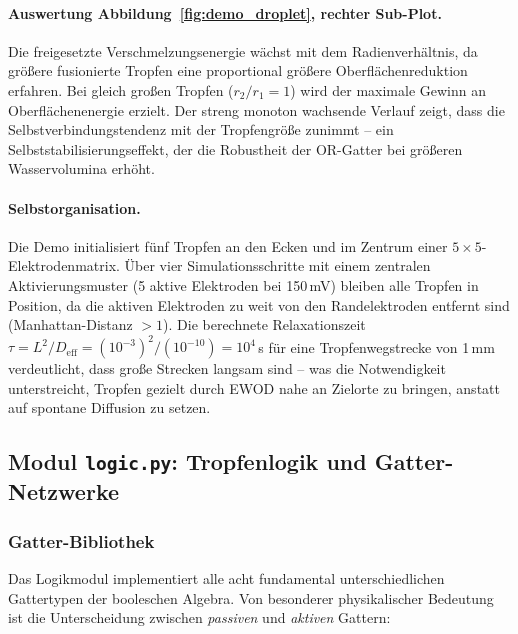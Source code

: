 ﻿\documentclass[a4paper,12pt]{scrreprt}
\theoremstyle{definition}
\begin{document}
\paragraph{Auswertung Abbildung~\ref{fig:demo_droplet}, rechter Sub-Plot.}
Die freigesetzte Verschmelzungsenergie wächst mit dem Radienverhältnis,
da größere fusionierte Tropfen eine proportional größere Oberflächenreduktion
erfahren. Bei gleich großen Tropfen ($r_2/r_1 = 1$) wird der maximale Gewinn
an Oberflächenenergie erzielt. Der streng monoton wachsende Verlauf zeigt,
dass die Selbstverbindungstendenz mit der Tropfengröße zunimmt -- ein
Selbststabilisierungseffekt, der die Robustheit der OR-Gatter bei größeren
Wasservolumina erhöht.

\paragraph{Selbstorganisation.}
Die Demo initialisiert fünf Tropfen an den Ecken und im Zentrum einer
$5 \times 5$-Elektrodenmatrix. Über vier Simulationsschritte mit einem
zentralen Aktivierungsmuster (5 aktive Elektroden bei 150\,mV) bleiben
alle Tropfen in Position, da die aktiven Elektroden zu weit von den
Randelektroden entfernt sind (Manhattan-Distanz $> 1$). Die berechnete
Relaxationszeit $\tau = L^2/D_\text{eff} = (10^{-3})^2/(10^{-10}) = 10^4$\,s
für eine Tropfenwegstrecke von 1\,mm verdeutlicht, dass große Strecken
langsam sind -- was die Notwendigkeit unterstreicht, Tropfen gezielt durch
EWOD nahe an Zielorte zu bringen, anstatt auf spontane Diffusion zu setzen.

\subsection{Modul \texttt{logic.py}: Tropfenlogik und Gatter-Netzwerke}
\label{subsec:demo_logic}

\subsubsection{Gatter-Bibliothek}

Das Logikmodul implementiert alle acht fundamental unterschiedlichen
Gattertypen der booleschen Algebra. Von besonderer physikalischer Bedeutung
ist die Unterscheidung zwischen \emph{passiven} und \emph{aktiven} Gattern:
\end{document}
